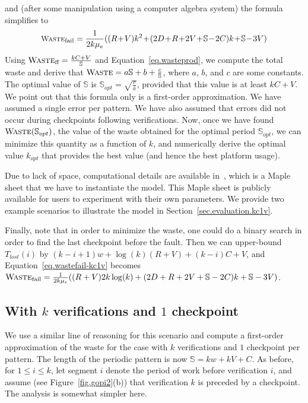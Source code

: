 \documentclass[10pt,table]{article}
\newcommand{\ema}[1]{\ensuremath{#1}\xspace}
\newcommand{\Xlost}{\ema{T_{lost}}}
\newcommand{\www}{\ema{w}}
\newcommand{\mue}{\ema{\mu_{e}}}
\newcommand{\ccc}{\ema{C}}
\newcommand{\rrr}{\ema{R}}
\newcommand{\ddd}{\ema{D}}
\newcommand{\vvv}{\ema{V}}
\newcommand{\sss}{\ema{\mathbb{S}}}
\newcommand{\Waste}{\ema{\textsc{Waste}}}
\newcommand{\Wasteff}{\ema{\textsc{Waste}_{\text{ff}}}}
\newcommand{\Wastefail}{\ema{\textsc{Waste}_{\text{fail}}}}
\begin{document}
and (after some manipulation using a computer algebra system) 
the formula simplifies to 
\begin{equation}
\small
\Wastefail = \frac{1}{2 k \mue}((\rrr\!+\!\vvv)k^{2} \!+\!(2\ddd\!+\!\rrr\!+\!2\vvv\!+\!\sss\!-\!2\ccc)k\!+\!\sss\!-\!3\vvv)
\label{eq.wastefail-kc1v}
\end{equation}
Using $\Wasteff = \frac{k\ccc + \vvv}{\sss}$ and Equation~\eqref{eq.wasteprod}, we compute
the total waste and derive that $\Waste = a \sss + b +  \frac{c}{\sss}$, where $a$, $b$, and $c$ are
some constants. The optimal value of $\sss$ is $\sss_{opt} = \sqrt{\frac{c}{a}}$, provided that this value
is at least $k\ccc + \vvv$. 
We point out that this formula only is a first-order approximation. We have assumed a single error
per pattern. We have also assumed that errors did not occur during
checkpoints following verifications.
Now, once we have found $\Waste(\sss_{opt})$, the value of the waste obtained
for the optimal period $\sss_{opt}$, we can minimize this quantity as a function of $k$, and 
numerically derive the
optimal value $k_{opt}$ that provides the best value (and hence the best platform usage). 

Due to lack of space, computational details are available in~\cite{webrefmaple}, which is
a Maple sheet that we have to instantiate the model. This Maple sheet is publicly available for
users to experiment with their own parameters. We provide two example scenarios to
illustrate the model in Section~\ref{sec.evaluation.kc1v}.

Finally, note that in order to minimize the waste, one could do a binary search in order to find the last
checkpoint before the fault. Then we can upper-bound $\Xlost(i)$ by $(k-i+1) \www+ \log(k)(\rrr+\vvv) + 
(k-i)\ccc + \vvv$, and Equation~\eqref{eq.wastefail-kc1v} becomes $\Wastefail = \frac{1}{2 k \mue}((\rrr+\vvv)2k \log(k) +(2\ddd+\rrr+2\vvv+\sss-2\ccc)k+\sss-3\vvv) $.

\subsection{With $k$ verifications and $1$ checkpoint}
\label{sec.kv1c}

We use  a similar line of reasoning for this scenario and compute 
a first-order approximation of the waste for the case with $k$ verifications and $1$ checkpoint per 
pattern. The length of the periodic pattern is now $\sss= k \www + k \vvv + \ccc$.
As before, for $1 \leq i \leq k$, let segment $i$ denote the period of work before 
verification $i$, and assume (see Figure~\ref{fig.gopi2}(b)) that verification $k$  is preceded by a
checkpoint.  The analysis is somewhat simpler here.
\end{document}
